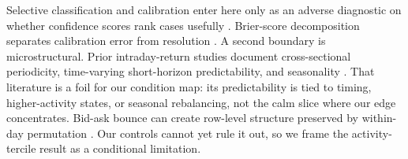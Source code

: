 Selective classification and calibration enter here only as an adverse diagnostic
on whether confidence scores rank cases usefully
\cite{geifman2017selective,guo2017calibration,traub2024overcoming,chalkidis2021trading}.
Brier-score decomposition separates calibration error from resolution
\cite{brier1950verification,murphy1973vector}. A second boundary is
microstructural. Prior intraday-return studies document cross-sectional
periodicity, time-varying short-horizon predictability, and seasonality
\cite{heston2010intraday,henkel2011timevarying,bogousslavsky2016infrequent}.
That literature is a foil for our condition map: its predictability is tied to
timing, higher-activity states, or seasonal rebalancing, not the calm slice where
our edge concentrates. Bid-ask bounce can create row-level structure preserved by
within-day permutation
\cite{roll1984simple,lo1990nonsynchronous}. Our controls cannot yet rule it out,
so we frame the activity-tercile result as a conditional limitation.
